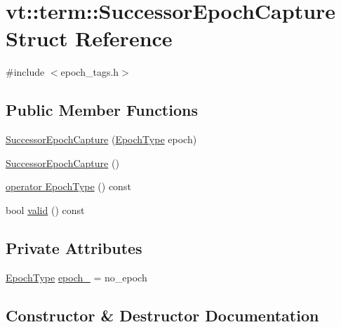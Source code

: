 \hypertarget{structvt_1_1term_1_1_successor_epoch_capture}{}\section{vt\+:\+:term\+:\+:Successor\+Epoch\+Capture Struct Reference}
\label{structvt_1_1term_1_1_successor_epoch_capture}


{\ttfamily \#include $<$epoch\+\_\+tags.\+h$>$}

\subsection*{Public Member Functions}
\begin{DoxyCompactItemize}
\item 
\hyperlink{structvt_1_1term_1_1_successor_epoch_capture_a381ce5ca6ccd31c0107afc6a8c811dae}{Successor\+Epoch\+Capture} (\hyperlink{namespacevt_a985a5adf291c34a3ca263b3378388236}{Epoch\+Type} epoch)
\item 
\hyperlink{structvt_1_1term_1_1_successor_epoch_capture_ada9a301cd6d1012f8a40916abd12a481}{Successor\+Epoch\+Capture} ()
\item 
\hyperlink{structvt_1_1term_1_1_successor_epoch_capture_a1e3fa8a36e11d5c11194ecc779c4d8a6}{operator Epoch\+Type} () const
\item 
bool \hyperlink{structvt_1_1term_1_1_successor_epoch_capture_ad21502111c09b6e08e9bd1200428f53e}{valid} () const
\end{DoxyCompactItemize}
\subsection*{Private Attributes}
\begin{DoxyCompactItemize}
\item 
\hyperlink{namespacevt_a985a5adf291c34a3ca263b3378388236}{Epoch\+Type} \hyperlink{structvt_1_1term_1_1_successor_epoch_capture_a05fadad7e140439c90905b2cdd5e265e}{epoch\+\_\+} = no\+\_\+epoch
\end{DoxyCompactItemize}


\subsection{Constructor \& Destructor Documentation}
\mbox{\label{structvt_1_1term_1_1_successor_epoch_capture_a381ce5ca6ccd31c0107afc6a8c811dae}} 
